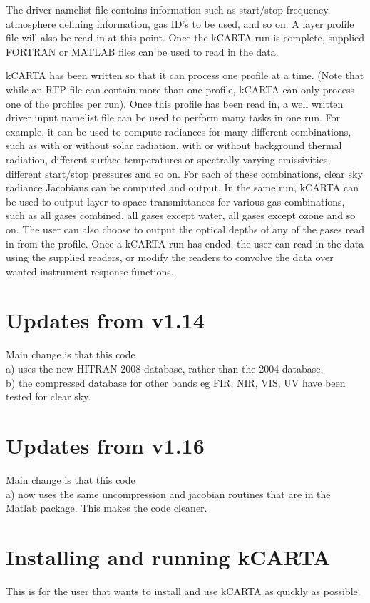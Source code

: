 \documentclass[12pt]{article}
\newcommand{\kc}{\textsf{kCARTA}\xspace}
\begin{document}
The driver namelist file contains information such as
start/stop frequency, atmosphere defining information, gas ID's to
be used, and so on.  A layer profile file will also
be read in at this point.  Once the \kc run is complete, supplied
{\sf FORTRAN} or {\sf MATLAB} files can be used to read in the data.

\kc has been written so that it can process one profile at a time. (Note that
while an RTP file can contain more than one profile, \kc can only process
one of the profiles per run). 
Once this profile has been read in, a well written driver input namelist file
can be used to perform many tasks in one run.  For example, it can be
used to compute radiances for many different combinations, such as
with or without solar radiation, with or without background thermal
radiation, different surface temperatures or spectrally varying
emissivities, different start/stop pressures and so on.  For each of
these combinations, clear sky radiance Jacobians can be computed and output. In
the same run, \kc can be used to output layer-to-space transmittances
for various gas combinations, such as all gases combined, all gases
except water, all gases except ozone and so on.  The user can also
choose to output the optical depths of any of the gases read in from
the profile.  Once a \kc run has ended, the user can read in the data
using the supplied readers, or modify the readers to convolve the data
over wanted instrument response functions.

\section{Updates from v1.14}
Main change is that this code \\
a) uses the new HITRAN 2008 database, rather than the 2004 database,\\
b) the compressed database for other bands eg FIR, NIR, VIS, UV have been tested 
   for clear sky.\\

\section{Updates from v1.16}
Main change is that this code \\
a) now uses the same uncompression and jacobian routines that are in the Matlab
   package. This makes the code cleaner. 

\section{Installing and running \kc}
This is for the user that wants to install and use \kc as quickly as possible. 
\end{document}
